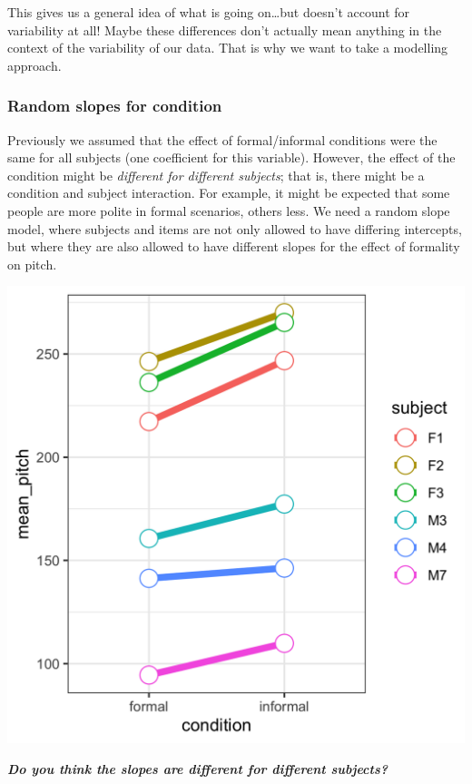 \documentclass[
  openany]{book}
\begin{document}
This gives us a general idea of what is going on\ldots but doesn't account for variability at all! Maybe these differences don't actually mean anything in the context of the variability of our data. That is why we want to take a modelling approach.

\hypertarget{random-slopes-for-condition}{%
\subsubsection{Random slopes for condition}\label{random-slopes-for-condition}}

Previously we assumed that the effect of formal/informal conditions were the same for all subjects (one coefficient for this variable). However, the effect of the condition might be \emph{different for different subjects}; that is, there might be a condition and subject interaction. For example, it might be expected that some people are more polite in formal scenarios, others less. We need a random slope model, where subjects and items are not only allowed to have differing intercepts, but where they are also allowed to have different slopes for the effect of formality on pitch.

\includegraphics[width=16.67in]{images/m3/subject_slopes}

\textbf{\emph{Do you think the slopes are different for different subjects?}}
\end{document}
